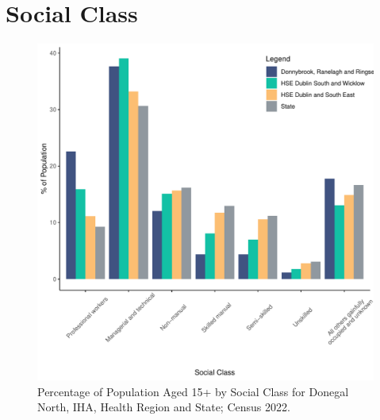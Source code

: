 \documentclass{article}
\begin{document}
\section{Social Class}\label{sect:SC}
\begin{figure}[H]
	\centering
	\includegraphics[width = 140mm]{../figures/SocialClassED.pdf}
	\caption{Percentage of Population Aged 15+ by Social Class for Donegal North, IHA, Health Region and State; Census 2022.}
	\label{fig:vbnv}
	\end{figure}
\end{document}
